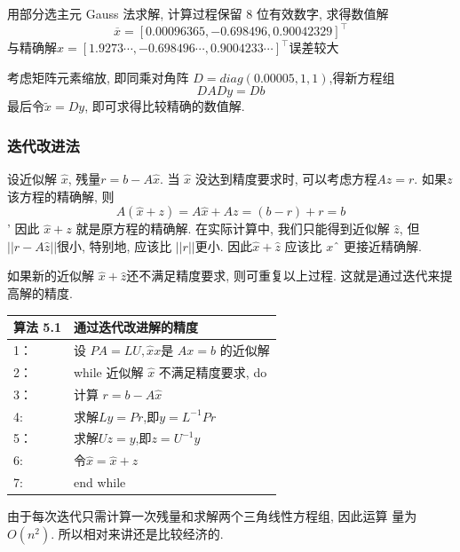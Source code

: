 \documentclass[12pt,a4paper]{article}
\begin{document}
用部分选主元 Gauss 法求解, 计算过程保留 8 位有效数字, 求得数值解
\begin{equation}
\overline{x}=[0.00096365,-0.698496,0.90042329]^{\top}
\end{equation}
与精确解$x=[1.9273 \cdots,-0.698496 \cdots, 0.9004233 \cdots]^{\top}$误差较大

考虑矩阵元素缩放, 即同乘对角阵  $D = diag(0.00005, 1, 1)$,得新方程组
\begin{equation}
D A D y=D b
\end{equation}
最后令$\tilde{x}=D y$, 即可求得比较精确的数值解.


\subsubsection{迭代改进法}
设近似解 $\hat{x}$, 残量$ r = b − A\hat{x}$. 当 $\hat{x}$ 没达到精度要求时, 可以考虑方程$Az = r$. 如果$ z $该方程的精确解, 则
\begin{equation}
A(\hat{x}+z)=A \hat{x}+A z=(b-r)+r=b
\end{equation}'
因此 $\hat{x} + z$ 就是原方程的精确解. 在实际计算中, 我们只能得到近似解 $\hat{z}$,
但 $||r-A\hat{z}||$很小, 特别地, 应该比 $||r||$更小. 因此$ \hat{x} + \hat{z}$ 应该比 $xˆ$ 更接近精确解.

如果新的近似解 $\hat{x} + \hat{z} $还不满足精度要求, 则可重复以上过程.
这就是通过迭代来提高解的精度.

\begin{table}  
	\begin{tabular*}{16cm}{ll}  
		\hline  
		算法 5.1 &通过迭代改进解的精度\\  
		\hline  
		1：   & 设 $P A = LU, \hat{x}x$是 $Ax = b$ 的近似解\\  
		2：   & while 近似解 $\hat{x}$ 不满足精度要求, do\\
		3：   & \qquad 计算 $r = b -A \hat{x}$ \\
		4:    & \qquad 求解$Ly=Pr$,即$y=L^{-1}Pr$\\
		5：    & \qquad 求解$Uz=y$,即$z=U^{-1}y$\\
		6:    & \qquad 令$\hat{x}=\hat{x}+z$\\
		7:    &end while\\
		\hline  
	\end{tabular*}  
\end{table}

由于每次迭代只需计算一次残量和求解两个三角线性方程组, 因此运算
量为 $O(n^2)$. 所以相对来讲还是比较经济的.
\end{document}
